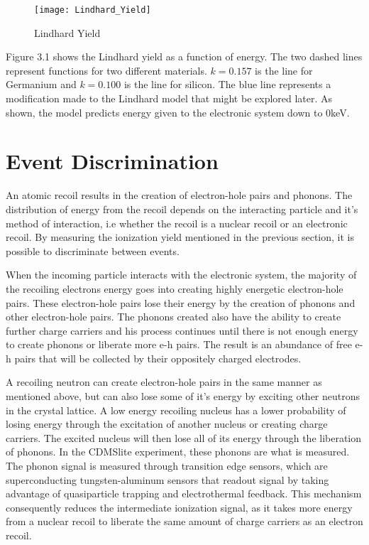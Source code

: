 \begin{figure}[h]
\centering
\texttt{[image: Lindhard\_Yield]}
\caption{Lindhard Yield}
\end{figure}

\noindent
Figure 3.1 shows the Lindhard yield as a function of energy. The two dashed lines represent functions for two different materials. $k = 0.157$ is the line for Germanium and $k = 0.100$ is the line for silicon. The blue line represents a modification made to the Lindhard model that might be explored later. As shown, the model predicts energy given to the electronic system down to 0keV. \par





\section{Event Discrimination}

An atomic recoil results in the creation of electron-hole pairs and phonons. The distribution of energy from the recoil depends on the interacting particle and it's method of interaction, i.e whether the recoil is a nuclear recoil or an electronic recoil. By measuring the ionization yield mentioned in the previous section, it is possible to discriminate between events. \par

When the incoming particle interacts with the electronic system, the majority of the recoiling electrons energy goes into creating highly energetic electron-hole pairs. These electron-hole pairs lose their energy by the creation of phonons and other electron-hole pairs. The phonons created also have the ability to create further charge carriers and his process continues until there is not enough energy to create phonons or liberate more e-h pairs.\cite{phipps_ionization_2016} The result is an abundance of free e-h pairs that will be collected by their oppositely charged electrodes.\par


A recoiling neutron can create electron-hole pairs in the same manner as mentioned above, but can also lose some of it's energy by exciting other neutrons in the crystal lattice. A low energy recoiling nucleus has a lower probability of losing energy through the excitation of another nucleus or creating charge carriers. The excited nucleus will then lose all of its energy through the liberation of phonons. In the CDMSlite experiment, these phonons are what is measured. The phonon signal is measured through transition edge sensors, which are superconducting tungsten-aluminum sensors that readout signal by taking advantage of quasiparticle trapping and electrothermal feedback.\cite{TES} This mechanism consequently reduces the intermediate ionization signal, as it takes more energy from a nuclear recoil to liberate the same amount of charge carriers as an electron recoil.\cite{Transport} \par

